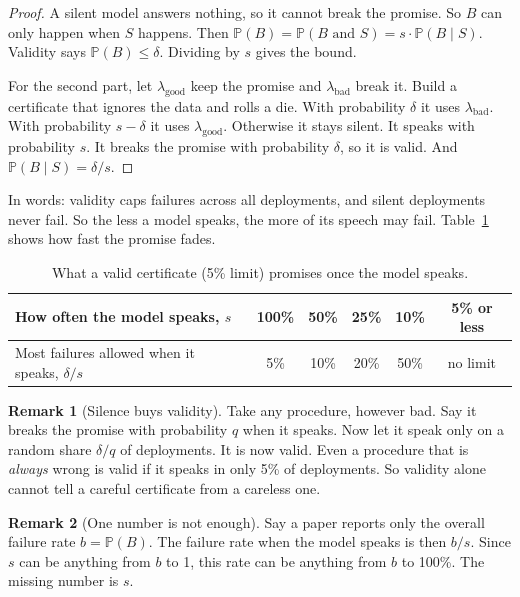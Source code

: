 \documentclass[11pt]{article}
\theoremstyle{plain}
\theoremstyle{definition}
\newtheorem{remark}{Remark}
\renewcommand{\Pr}{\mathbb{P}}
\begin{document}
\begin{proof}
A silent model answers nothing, so it cannot break the promise. So $B$ can only happen when $S$ happens. Then $\Pr(B) = \Pr(B \text{ and } S) = s \cdot \Pr(B \mid S)$. Validity says $\Pr(B) \le \delta$. Dividing by $s$ gives the bound.

For the second part, let $\lambda_{\text{good}}$ keep the promise and $\lambda_{\text{bad}}$ break it. Build a certificate that ignores the data and rolls a die. With probability $\delta$ it uses $\lambda_{\text{bad}}$. With probability $s - \delta$ it uses $\lambda_{\text{good}}$. Otherwise it stays silent. It speaks with probability $s$. It breaks the promise with probability $\delta$, so it is valid. And $\Pr(B \mid S) = \delta / s$.
\end{proof}

In words: validity caps failures across all deployments, and silent deployments never fail. So the less a model speaks, the more of its speech may fail. Table~\ref{tab:room} shows how fast the promise fades.

\begin{table}[h]
\centering
\small
\caption{What a valid certificate (5\% limit) promises once the model speaks.}
\label{tab:room}
\begin{tabular}{lccccc}
\toprule
How often the model speaks, $s$ & 100\% & 50\% & 25\% & 10\% & 5\% or less \\
\midrule
Most failures allowed when it speaks, $\delta/s$ & 5\% & 10\% & 20\% & 50\% & no limit \\
\bottomrule
\end{tabular}
\end{table}

\begin{remark}[Silence buys validity]
\label{rem:buys}
Take any procedure, however bad. Say it breaks the promise with probability $q$ when it speaks. Now let it speak only on a random share $\delta/q$ of deployments. It is now valid. Even a procedure that is \emph{always} wrong is valid if it speaks in only 5\% of deployments. So validity alone cannot tell a careful certificate from a careless one.
\end{remark}

\begin{remark}[One number is not enough]
\label{rem:one}
Say a paper reports only the overall failure rate $b = \Pr(B)$. The failure rate when the model speaks is then $b / s$. Since $s$ can be anything from $b$ to 1, this rate can be anything from $b$ to 100\%. The missing number is $s$.
\end{remark}
\end{document}
